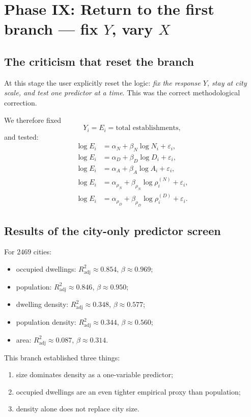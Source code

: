 \documentclass[11pt]{article}
\newcommand{\adjR}{R^2_{\mathrm{adj}}}
\begin{document}
\section{Phase IX: Return to the first branch --- fix \(Y\), vary \(X\)}

\subsection{The criticism that reset the branch}

At this stage the user explicitly reset the logic: \emph{fix the response \(Y\), stay at city scale, and test one predictor at a time}. This was the correct methodological correction.

We therefore fixed
\begin{equation}
Y_i = E_i = \text{total establishments},
\end{equation}
and tested:
\begin{align}
\log E_i &= \alpha_N + \beta_N \log N_i + \varepsilon_i,\\
\log E_i &= \alpha_D + \beta_D \log D_i + \varepsilon_i,\\
\log E_i &= \alpha_A + \beta_A \log A_i + \varepsilon_i,\\
\log E_i &= \alpha_{\rho_N} + \beta_{\rho_N} \log \rho_i^{(N)} + \varepsilon_i,\\
\log E_i &= \alpha_{\rho_D} + \beta_{\rho_D} \log \rho_i^{(D)} + \varepsilon_i.
\end{align}

\subsection{Results of the city-only predictor screen}

For \(2469\) cities:
\begin{itemize}
\item occupied dwellings: \(\adjR \approx 0.854\), \(\beta \approx 0.969\);
\item population: \(\adjR \approx 0.846\), \(\beta \approx 0.950\);
\item dwelling density: \(\adjR \approx 0.348\), \(\beta \approx 0.577\);
\item population density: \(\adjR \approx 0.344\), \(\beta \approx 0.560\);
\item area: \(\adjR \approx 0.087\), \(\beta \approx 0.314\).
\end{itemize}

This branch established three things:
\begin{enumerate}[label=\arabic*.,leftmargin=2.0em]
\item size dominates density as a one-variable predictor;
\item occupied dwellings are an even tighter empirical proxy than population;
\item density alone does not replace city size.
\end{enumerate}
\end{document}
